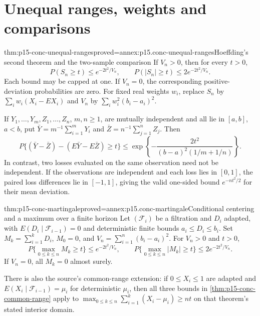 \section{Unequal ranges, weights and comparisons}

\begin{hbtheorem}{thm:p15-conc-unequal-ranges}{proved=annex:p15.conc-unequal-ranges}{Hoeffding's second theorem and the two-sample comparison}
If \(V_n>0\), then for every \(t>0\),
\[
 P(S_n\geq t)\leq e^{-2t^2/V_n},\qquad
 P(|S_n|\geq t)\leq 2e^{-2t^2/V_n}.
\]
Each bound may be capped at one. If \(V_n=0\), the
corresponding positive-deviation probabilities are zero.
For fixed real weights \(w_i\), replace \(S_n\) by
\(\sum_iw_i(X_i-EX_i)\) and \(V_n\) by
\(\sum_iw_i^2(b_i-a_i)^2\).

If \(Y_1,\ldots,Y_m,Z_1,\ldots,Z_n\), \(m,n\geq1\), are mutually
independent and all lie in \([a,b]\), \(a<b\), put
\(\bar Y=m^{-1}\sum_{i=1}^mY_i\) and
\(\bar Z=n^{-1}\sum_{j=1}^nZ_j\). Then
\[
 P\{(\bar Y-\bar Z)-(E\bar Y-E\bar Z)\geq t\}
 \leq
 \exp\!\left\{-\frac{2t^2}{(b-a)^2(1/m+1/n)}\right\}.
\]
In contrast, two losses evaluated on the same observation need
not be independent. If the observations are independent and each
loss lies in \([0,1]\), the paired loss differences lie in
\([-1,1]\), giving the valid one-sided bound
\(e^{-nt^2/2}\) for their mean deviation.
\end{hbtheorem}

\begin{hbtheorem}{thm:p15-conc-martingale}{proved=annex:p15.conc-martingale}{Conditional centering and a maximum over a finite horizon}
Let \((\mathcal F_i)\) be a filtration and \(D_i\) adapted,
with \(E(D_i\mid\mathcal F_{i-1})=0\) and deterministic
finite bounds \(a_i\leq D_i\leq b_i\).
Set \(M_k=\sum_{i=1}^kD_i\), \(M_0=0\), and
\(V_n=\sum_{i=1}^n(b_i-a_i)^2\).
For \(V_n>0\) and \(t>0\),
\[
 P\{\max_{0\leq k\leq n}M_k\geq t\}\leq e^{-2t^2/V_n},
 \qquad
 P\{\max_{0\leq k\leq n}|M_k|\geq t\}
                      \leq2e^{-2t^2/V_n}.
\]
If \(V_n=0\), all \(M_k=0\) almost surely.

There is also the source's common-range extension: if
\(0\leq X_i\leq1\) are adapted and
\(E(X_i\mid\mathcal F_{i-1})=\mu_i\) for deterministic
\(\mu_i\), then all three bounds in
\cref{thm:p15-conc-common-range} apply to
\(\max_{0\leq k\leq n}\sum_{i=1}^k(X_i-\mu_i)\geq nt\)
on that theorem's stated interior domain.
\end{hbtheorem}

